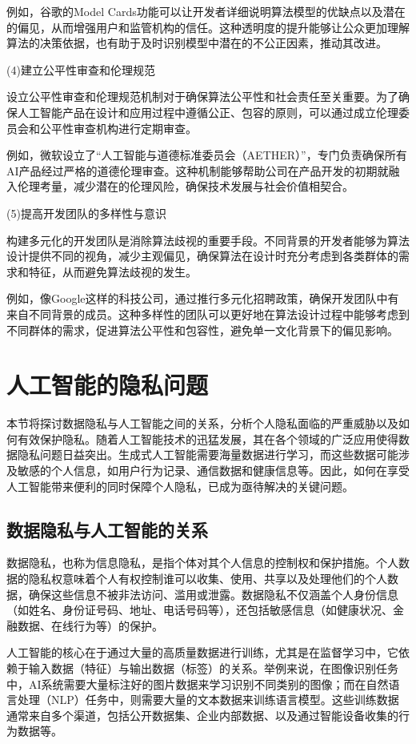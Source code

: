 例如，谷歌的Model Cards功能可以让开发者详细说明算法模型的优缺点以及潜在的偏见，从而增强用户和监管机构的信任。这种透明度的提升能够让公众更加理解算法的决策依据，也有助于及时识别模型中潜在的不公正因素，推动其改进。

(4)建立公平性审查和伦理规范

设立公平性审查和伦理规范机制对于确保算法公平性和社会责任至关重要。为了确保人工智能产品在设计和应用过程中遵循公正、包容的原则，可以通过成立伦理委员会和公平性审查机构进行定期审查。

例如，微软设立了“人工智能与道德标准委员会（AETHER）”，专门负责确保所有AI产品经过严格的道德伦理审查。这种机制能够帮助公司在产品开发的初期就融入伦理考量，减少潜在的伦理风险，确保技术发展与社会价值相契合。

(5)提高开发团队的多样性与意识

构建多元化的开发团队是消除算法歧视的重要手段。不同背景的开发者能够为算法设计提供不同的视角，减少主观偏见，确保算法在设计时充分考虑到各类群体的需求和特征，从而避免算法歧视的发生。

例如，像Google这样的科技公司，通过推行多元化招聘政策，确保开发团队中有来自不同背景的成员。这种多样性的团队可以更好地在算法设计过程中能够考虑到不同群体的需求，促进算法公平性和包容性，避免单一文化背景下的偏见影响。

\section{人工智能的隐私问题}

本节将探讨数据隐私与人工智能之间的关系，分析个人隐私面临的严重威胁以及如何有效保护隐私。随着人工智能技术的迅猛发展，其在各个领域的广泛应用使得数据隐私问题日益突出。生成式人工智能需要海量数据进行学习，而这些数据可能涉及敏感的个人信息，如用户行为记录、通信数据和健康信息等。因此，如何在享受人工智能带来便利的同时保障个人隐私，已成为亟待解决的关键问题。

\subsection{数据隐私与人工智能的关系}
数据隐私，也称为信息隐私，是指个体对其个人信息的控制权和保护措施。个人数据的隐私权意味着个人有权控制谁可以收集、使用、共享以及处理他们的个人数据，确保这些信息不被非法访问、滥用或泄露。数据隐私不仅涵盖个人身份信息（如姓名、身份证号码、地址、电话号码等），还包括敏感信息（如健康状况、金融数据、在线行为等）的保护。

人工智能的核心在于通过大量的高质量数据进行训练，尤其是在监督学习中，它依赖于输入数据（特征）与输出数据（标签）的关系。举例来说，在图像识别任务中，AI系统需要大量标注好的图片数据来学习识别不同类别的图像；而在自然语言处理（NLP）任务中，则需要大量的文本数据来训练语言模型。这些训练数据通常来自多个渠道，包括公开数据集、企业内部数据、以及通过智能设备收集的行为数据等。

